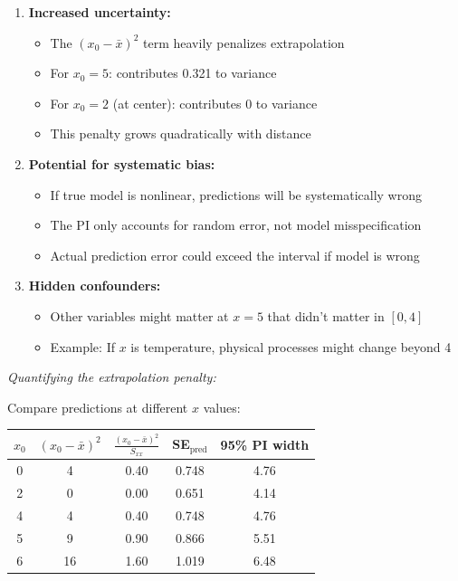 \documentclass[12pt]{article}
\begin{document}
\begin{explanation}
\begin{enumerate}
    \item \textbf{Increased uncertainty:}
    \begin{itemize}
        \item The $(x_0 - \bar{x})^2$ term heavily penalizes extrapolation
        \item For $x_0 = 5$: contributes 0.321 to variance
        \item For $x_0 = 2$ (at center): contributes 0 to variance
        \item This penalty grows quadratically with distance
    \end{itemize}

    \item \textbf{Potential for systematic bias:}
    \begin{itemize}
        \item If true model is nonlinear, predictions will be systematically wrong
        \item The PI only accounts for random error, not model misspecification
        \item Actual prediction error could exceed the interval if model is wrong
    \end{itemize}

    \item \textbf{Hidden confounders:}
    \begin{itemize}
        \item Other variables might matter at $x = 5$ that didn't matter in $[0, 4]$
        \item Example: If $x$ is temperature, physical processes might change beyond 4
    \end{itemize}
\end{enumerate}

\textit{Quantifying the extrapolation penalty:}

Compare predictions at different $x$ values:

\begin{center}
\begin{tabular}{|c|c|c|c|c|}
\hline
$x_0$ & $(x_0-\bar{x})^2$ & $\frac{(x_0-\bar{x})^2}{S_{xx}}$ & SE$_{\text{pred}}$ & 95\% PI width \\
\hline
0 & 4 & 0.40 & 0.748 & 4.76 \\
2 & 0 & 0.00 & 0.651 & 4.14 \\
4 & 4 & 0.40 & 0.748 & 4.76 \\
5 & 9 & 0.90 & 0.866 & 5.51 \\
6 & 16 & 1.60 & 1.019 & 6.48 \\
\hline
\end{tabular}
\end{center}


\end{explanation}
\end{document}
